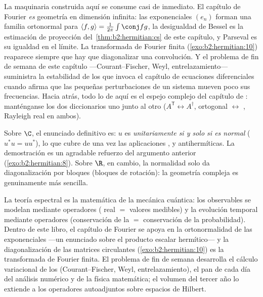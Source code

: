 \begin{remark}
La maquinaria  construida aquí se consume casi de
inmediato. El capítulo de Fourier \emph{es} geometría  en
dimensión infinita: las exponenciales $(e_n)$ forman una familia
ortonormal para $\langle f, g\rangle = \frac{1}{2\pi}\int\conj fg$,
la desigualdad de Bessel es la estimación de proyección del~\cref{thm:b2:hermitian:cs} de este capítulo, y Parseval es su
igualdad en el límite. La transformada de Fourier finita
(\cref{exo:b2:hermitian:10}) reaparece siempre que hay que
diagonalizar una convolución. Y el problema de fin de semana de este
capítulo ---Courant--Fischer, Weyl, entrelazamiento--- suministra la
estabilidad de los  que invoca el capítulo de
ecuaciones diferenciales cuando afirma que las pequeñas
perturbaciones de un sistema mueven poco sus frecuencias. Hacia
atrás, todo lo de aquí es el espejo complejo del capítulo de : manténganse los dos diccionarios uno junto al otro
($A^{\mathsf T} \leftrightarrow A^\dagger$, ortogonal
$\leftrightarrow$ , Rayleigh real en ambos).
\end{remark}

\begin{remark}
Sobre $\C$, el enunciado definitivo es: $u$ es \emph{unitariamente
 si y solo si es normal} ($u^*u = uu^*$), lo que
cubre de una vez las aplicaciones ,  y
antihermíticas. La demostración es un agradable refuerzo del
argumento anterior (\cref{exo:b2:hermitian:8}). Sobre $\R$, en
cambio, la normalidad solo da diagonalización por bloques (bloques de
rotación): la geometría compleja es genuinamente más sencilla.
\end{remark}

\begin{remark}
La teoría espectral  es la matemática de la mecánica
cuántica: los observables se modelan mediante operadores
 ( real $=$ valores medibles) y la evolución
temporal mediante operadores  (conservación de la 
$=$ conservación de la probabilidad). Dentro de este libro, el
capítulo de Fourier se apoya en la ortonormalidad de las
exponenciales ---un enunciado sobre el producto escalar
hermítico--- y la diagonalización de las matrices circulantes
(\cref{exo:b2:hermitian:10}) es la transformada de Fourier finita. El
problema de fin de semana desarrolla el cálculo variacional de los
 (Courant--Fischer, Weyl, entrelazamiento), el pan de
cada día del análisis numérico y de la física matemática; el volumen
del tercer año lo extiende a los operadores 
autoadjuntos sobre espacios de Hilbert.
\end{remark}

